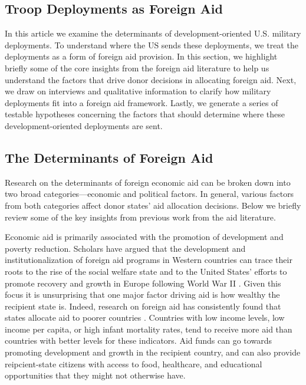 \documentclass[12pt]{article}
\begin{document}
\begin{doublespace}
\section{Troop Deployments as Foreign Aid}

In this article we examine the determinants of development-oriented U.S. military deployments. To understand where the US sends these deployments, we treat the deployments as a form of foreign aid provision. In this section, we highlight briefly some of the core insights from the foreign aid literature to help us understand the factors that drive donor decisions in allocating foreign aid. Next, we draw on interviews and qualitative information to clarify how military deployments fit into a foreign aid framework. Lastly, we generate a series of testable hypotheses concerning the factors that should determine where these development-oriented deployments are sent.


\subsection{The Determinants of Foreign Aid}
Research on the determinants of foreign economic aid can be broken down into two broad categories---economic and political factors. In general, various factors from both categories affect donor states' aid allocation decisions. Below we briefly review some of the key insights from previous work from the aid literature.   

Economic aid is primarily associated with the promotion of development and poverty reduction. Scholars have argued that the development and institutionalization of foreign aid programs in Western countries can trace their roots to the rise of the social welfare state and to the United States' efforts to promote recovery and growth in Europe following World War II \cite{Therien2002,TherienNoel2000}. Given this focus it is unsurprising that one major factor driving aid is how wealthy the recipient state is. Indeed, research on foreign aid has consistently found that states allocate aid to poorer countries . Countries with low income levels, low income per capita, or high infant mortality rates, tend to receive more aid than countries with better levels for these indicators. Aid funds can go towards promoting development and growth in the recipient country, and can also provide reipcient-state citizens with access to food, healthcare, and educational opportunities that they might not otherwise have. 


\end{doublespace}
\end{document}
